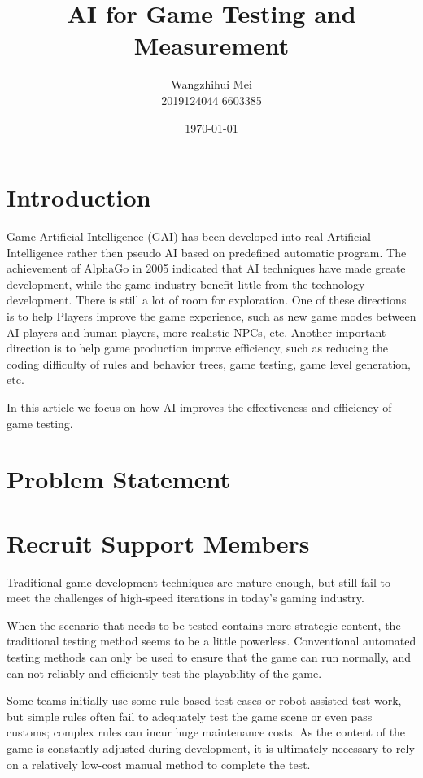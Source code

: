 \documentclass[11pt,en,authoryear]{elegantpaper}
\title{ AI for Game Testing and Measurement}
\author{Wangzhihui Mei \\ 2019124044 6603385}
\institute{UOW-CCNU JI}
\date{\today}
\begin{document}
\maketitle

 


\section{Introduction}

Game Artificial Intelligence (GAI) has been developed into real Artificial Intelligence rather then pseudo AI based on predefined automatic program. The achievement of AlphaGo in 2005 indicated that AI techniques have made greate development, while the game industry benefit little from the technology development. There is still a lot of room for exploration. One of these directions is to help Players improve the game experience, such as new game modes between AI players and human players, more realistic NPCs, etc. Another important direction is to help game production improve efficiency, such as reducing the coding difficulty of rules and behavior trees, game testing, game level generation, etc.

In this article we focus on how AI improves the effectiveness and efficiency of game testing.

\section{Problem  Statement}


\section{Recruit Support Members}

Traditional game development techniques are mature enough, but still fail to meet the challenges of high-speed iterations in today's gaming industry.

When the scenario that needs to be tested contains more strategic content, the traditional testing method seems to be a little powerless. Conventional automated testing methods can only be used to ensure that the game can run normally, and can not reliably and efficiently test the playability of the game.

Some teams initially use some rule-based test cases or robot-assisted test work, but simple rules often fail to adequately test the game scene or even pass customs; complex rules can incur huge maintenance costs. As the content of the game is constantly adjusted during development, it is ultimately necessary to rely on a relatively low-cost manual method to complete the test.
\end{document}
